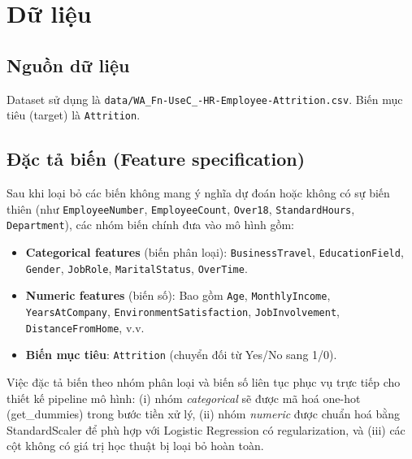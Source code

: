 \chapter{Dữ liệu}

\section{Nguồn dữ liệu}
Dataset sử dụng là \texttt{data/WA\_Fn-UseC\_-HR-Employee-Attrition.csv}. Biến mục tiêu (target) là \texttt{Attrition}.

\section{Đặc tả biến (Feature specification)}
Sau khi loại bỏ các biến không mang ý nghĩa dự đoán hoặc không có sự biến thiên (như \texttt{EmployeeNumber}, \texttt{EmployeeCount}, \texttt{Over18}, \texttt{StandardHours}, \texttt{Department}), các nhóm biến chính đưa vào mô hình gồm:
\begin{itemize}
  \item \textbf{Categorical features} (biến phân loại): \texttt{BusinessTravel}, \texttt{EducationField}, \texttt{Gender}, \texttt{JobRole}, \texttt{MaritalStatus}, \texttt{OverTime}.
  \item \textbf{Numeric features} (biến số): Bao gồm \texttt{Age}, \texttt{MonthlyIncome}, \texttt{YearsAtCompany}, \texttt{EnvironmentSatisfaction}, \texttt{JobInvolvement}, \texttt{DistanceFromHome}, v.v.
  \item \textbf{Biến mục tiêu}: \texttt{Attrition} (chuyển đối từ Yes/No sang 1/0).
\end{itemize}

\noindent
Việc đặc tả biến theo nhóm phân loại và biến số liên tục phục vụ trực tiếp cho thiết kế pipeline mô hình: 
(i) nhóm \textit{categorical} sẽ được mã hoá one-hot (get\_dummies) trong bước tiền xử lý, 
(ii) nhóm \textit{numeric} được chuẩn hoá bằng StandardScaler để phù hợp với Logistic Regression có regularization, 
và (iii) các cột không có giá trị học thuật bị loại bỏ hoàn toàn.

